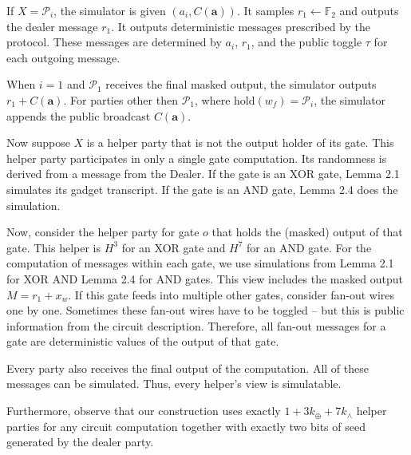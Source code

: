 If $X=\mathcal{P}_{i}$, the simulator is given $(a_{i},C(\mathbf{a}))$. It samples $r_{1}\leftarrow\mathbb{F}_{2}$ and outputs the dealer message $r_{1}$. It outputs deterministic messages prescribed by the protocol.
These messages are determined by $a_{i}$, $r_{1}$, and the public toggle $\tau$ for each outgoing message.\par




When $i=1$ and $\mathcal{P}_{1}$ receives the final masked output, the simulator outputs $r_{1}+C(\mathbf{a})$. For parties other then $\mathcal{P}_{1}$, where $\mathrm{hold}(w_{f})=\mathcal{P}_{i}$, the simulator appends the public broadcast $C(\mathbf{a})$.\par




Now suppose $X$ is a helper party that is not the output holder of its gate. This helper party participates in only a single gate computation. Its randomness is derived from a message from the Dealer. If the gate is an XOR gate, Lemma 2.1 simulates its gadget transcript. If the gate is an AND gate, Lemma 2.4 does the simulation.\par




Now, consider the helper party for gate $o$ that holds the (masked) output of that gate. This helper is $H^{3}$ for an XOR gate and $H^{7}$ for an AND gate. For the computation of messages within each gate, we use simulations from Lemma 2.1 for XOR AND Lemma 2.4 for AND gates. This view includes the masked output $M=r_{1}+x_{w}$. If this gate feeds into multiple other gates, consider fan-out wires one by one. Sometimes these fan-out wires have to be toggled – but this is public information from the circuit description.
Therefore, all fan-out messages for a gate are deterministic values of the output of that gate.\par




Every party also receives the final output of the computation. All of these messages can be simulated. Thus, every helper’s view is simulatable.\par




Furthermore, observe that our construction uses exactly $1+3k_{\oplus}+7k_{\wedge}$ helper parties for any circuit computation together with exactly two bits of seed generated by the dealer party.\par




